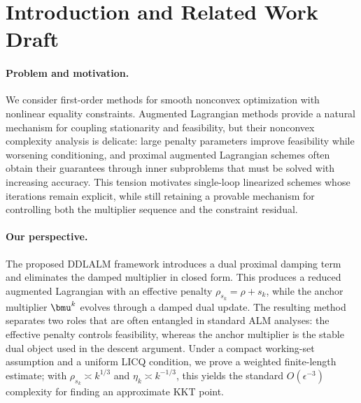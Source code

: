 \section{Introduction and Related Work Draft}
\label{sec:rw-draft}

\paragraph{Problem and motivation.}
We consider first-order methods for smooth nonconvex optimization with
nonlinear equality constraints.  Augmented Lagrangian methods provide a
natural mechanism for coupling stationarity and feasibility, but their
nonconvex complexity analysis is delicate: large penalty parameters improve
feasibility while worsening conditioning, and proximal augmented Lagrangian
schemes often obtain their guarantees through inner subproblems that must be
solved with increasing accuracy.  This tension motivates single-loop
linearized schemes whose iterations remain explicit, while still retaining a
provable mechanism for controlling both the multiplier sequence and the
constraint residual.

\paragraph{Our perspective.}
The proposed DDLALM framework introduces a dual proximal damping term and
eliminates the damped multiplier in closed form.  This produces a reduced
augmented Lagrangian with an effective penalty
$\rho_{s_k}=\rho+s_k$, while the anchor multiplier $\bmu^k$ evolves through a
damped dual update.  The resulting method separates two roles that are often
entangled in standard ALM analyses: the effective penalty controls feasibility,
whereas the anchor multiplier is the stable dual object used in the descent
argument.  Under a compact working-set assumption and a uniform LICQ condition,
we prove a weighted finite-length estimate; with
$\rho_{s_k}\asymp k^{1/3}$ and $\eta_k\asymp k^{-1/3}$, this yields the
standard $O(\epsilon^{-3})$ complexity for finding an approximate KKT point.

